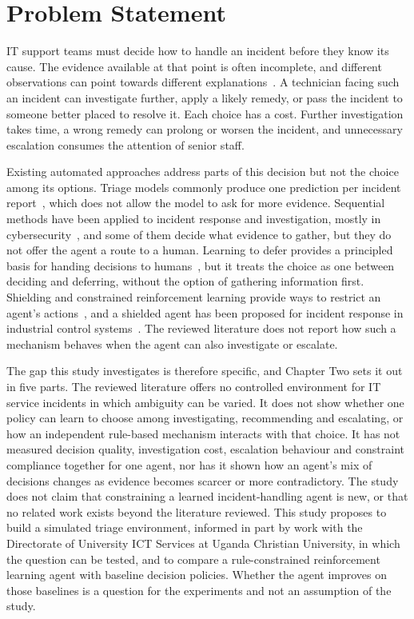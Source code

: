 \documentclass[12pt,a4paper]{article}
\begin{document}
\section{Problem Statement}

IT support teams must decide how to handle an incident before they know its cause. The evidence available at that point is often incomplete, and different observations can point towards different explanations~\cite{chen2020,remil2024}. A technician facing such an incident can investigate further, apply a likely remedy, or pass the incident to someone better placed to resolve it. Each choice has a cost. Further investigation takes time, a wrong remedy can prolong or worsen the incident, and unnecessary escalation consumes the attention of senior staff.

Existing automated approaches address parts of this decision but not the choice among its options. Triage models commonly produce one prediction per incident report~\cite{chen2020,remil2024}, which does not allow the model to ask for more evidence. Sequential methods have been applied to incident response and investigation, mostly in cybersecurity~\cite{ren2025,dunsin2025,kim2025,hammar2025}, and some of them decide what evidence to gather, but they do not offer the agent a route to a human. Learning to defer provides a principled basis for handing decisions to humans~\cite{madras2018,joshi2023}, but it treats the choice as one between deciding and deferring, without the option of gathering information first. Shielding and constrained reinforcement learning provide ways to restrict an agent's actions~\cite{alshiekh2018,achiam2017}, and a shielded agent has been proposed for incident response in industrial control systems~\cite{alauthman2026}. The reviewed literature does not report how such a mechanism behaves when the agent can also investigate or escalate.

The gap this study investigates is therefore specific, and Chapter Two sets it out in five parts. The reviewed literature offers no controlled environment for IT service incidents in which ambiguity can be varied. It does not show whether one policy can learn to choose among investigating, recommending and escalating, or how an independent rule-based mechanism interacts with that choice. It has not measured decision quality, investigation cost, escalation behaviour and constraint compliance together for one agent, nor has it shown how an agent's mix of decisions changes as evidence becomes scarcer or more contradictory. The study does not claim that constraining a learned incident-handling agent is new, or that no related work exists beyond the literature reviewed. This study proposes to build a simulated triage environment, informed in part by work with the Directorate of University ICT Services at Uganda Christian University, in which the question can be tested, and to compare a rule-constrained reinforcement learning agent with baseline decision policies. Whether the agent improves on those baselines is a question for the experiments and not an assumption of the study.
\end{document}
